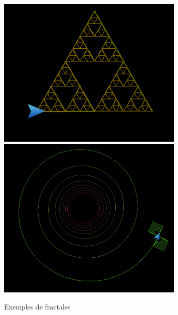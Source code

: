\documentclass[11pt,a4paper]{article}
\begin{document}
\begin{figure}[H]
    \centering
    \includegraphics[width=0.8\textwidth]{img/sierpinski}
    \includegraphics[width=0.8\textwidth]{img/spiral_square}
    \caption{Exemples de fractales}
    \label{fig:fractales}
\end{figure}
\end{document}
